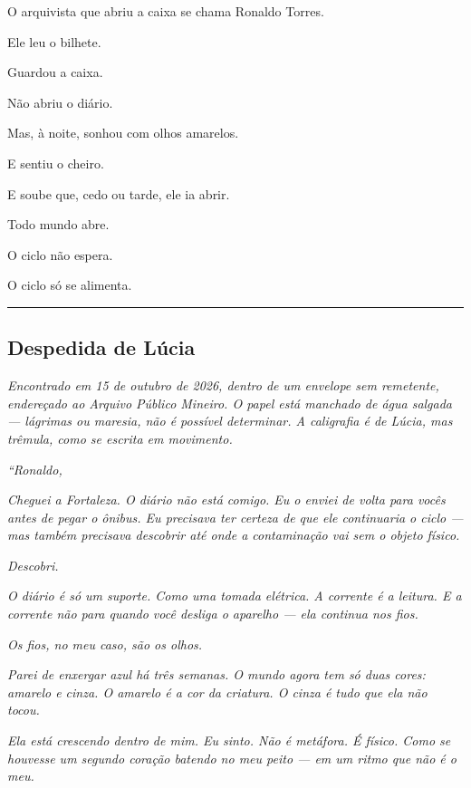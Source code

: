 \noindent O arquivista que abriu a caixa se chama Ronaldo Torres.

\noindent Ele leu o bilhete.

\noindent Guardou a caixa.

\noindent Não abriu o diário.

\noindent Mas, à noite, sonhou com olhos amarelos.

\noindent E sentiu o cheiro.

\noindent E soube que, cedo ou tarde, ele ia abrir.

\noindent Todo mundo abre.

\noindent O ciclo não espera.

\noindent O ciclo só se alimenta.

\vspace{0.5em}\noindent\rule{\textwidth}{0.5pt}\vspace{0.5em}

\subsection*{Despedida de Lúcia}

\noindent \textit{Encontrado em 15 de outubro de 2026, dentro de um envelope sem remetente, endereçado ao Arquivo Público Mineiro. O papel está manchado de água salgada --- lágrimas ou maresia, não é possível determinar. A caligrafia é de Lúcia, mas trêmula, como se escrita em movimento.}

\noindent \textit{\textquotedblleft{}Ronaldo,}

\noindent \textit{Cheguei a Fortaleza. O diário não está comigo. Eu o enviei de volta para vocês antes de pegar o ônibus. Eu precisava ter certeza de que ele continuaria o ciclo --- mas também precisava descobrir até onde a contaminação vai sem o objeto físico.}

\noindent \textit{Descobri.}

\noindent \textit{O diário é só um suporte. Como uma tomada elétrica. A corrente é a leitura. E a corrente não para quando você desliga o aparelho --- ela continua nos fios.}

\noindent \textit{Os fios, no meu caso, são os olhos.}

\noindent \textit{Parei de enxergar azul há três semanas. O mundo agora tem só duas cores: amarelo e cinza. O amarelo é a cor da criatura. O cinza é tudo que ela não tocou.}

\noindent \textit{Ela está crescendo dentro de mim. Eu sinto. Não é metáfora. É físico. Como se houvesse um segundo coração batendo no meu peito --- em um ritmo que não é o meu.}

